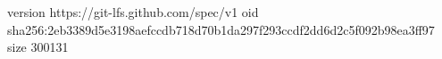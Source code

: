 version https://git-lfs.github.com/spec/v1
oid sha256:2eb3389d5e3198aefccdb718d70b1da297f293ccdf2dd6d2c5f092b98ea3ff97
size 300131
